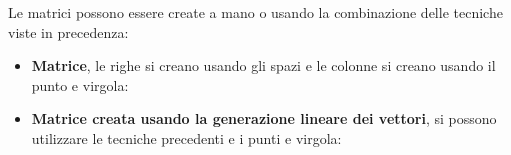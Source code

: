 \documentclass[a4paper]{article}
\begin{document}
    Le matrici possono essere create a mano o usando la combinazione delle tecniche viste in precedenza:
    \begin{itemize}
        \item \textbf{Matrice}, le righe si creano usando gli spazi e le colonne si creano usando il punto e virgola:
        

        \item \textbf{Matrice creata usando la generazione lineare dei vettori}, si possono utilizzare le tecniche precedenti e i punti e virgola:
        
    \end{itemize}

    \newpage
\end{document}
